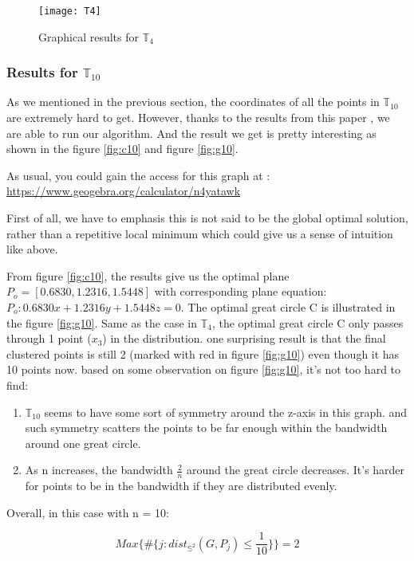 \documentclass[12pt]{article}
\numberwithin{equation}{section}
\let\bb\mathbb
\let\bb\mathbb
\begin{document}
		\begin{figure}
			\centering
			\texttt{[image: T4]}
			\caption{Graphical results for $\bb{T}_4$ }
			\label{fig:g4}
		\end{figure}

		\subsubsection{Results for $\bb{T}_{10}$}
			As we mentioned in the previous section, the coordinates of all the points in $\bb{T}_{10}$ are extremely hard to get. However, thanks to the results from this paper \cite{sugimoto_2015_exact}, we are able to run our algorithm. And the result we get is pretty interesting as shown in the figure \ref{fig:c10} and figure \ref{fig:g10}. \par
			As usual, you could gain the access for this graph at : \url{https://www.geogebra.org/calculator/n4yatawk}\par
			
			First of all, we have to emphasis this is not said to be the global optimal solution, rather than a repetitive local minimum which could give us a sense of intuition like above.\par
			From figure \ref{fig:c10}, the results give us the optimal plane $P_o = [0.6830, 1.2316, 1.5448]$ with corresponding plane equation: $P_o: 0.6830x+1.2316y+1.5448z=0$. The optimal great circle C is illustrated in the figure \ref{fig:g10}. Same as the case in $\bb{T}_4$, the optimal great circle C only passes through 1 point ($x_3$) in the distribution. one surprising result is that the final clustered points is still 2 (marked with red in figure \ref{fig:g10}) even though it has 10 points now. based on some observation on figure \ref{fig:g10}, it's not too hard to find:
			\begin{enumerate}
				\item $\bb{T}_{10}$ seems to have some sort of symmetry around the z-axis in this graph. and such symmetry scatters the points to be far enough within the bandwidth around one great circle.
				\item As n increases, the bandwidth $\frac{2}{n}$ around the great circle decreases. It's harder for points to be in the bandwidth if they are distributed evenly.
			\end{enumerate} 
		
			Overall, in this case with n = 10:
			
			\[ Max \{\#  \{ j:dist_{{\bb{S}}^2} (G, P_j)\leq \dfrac{1}{10} \}\} = 2\] 
		
\end{document}
